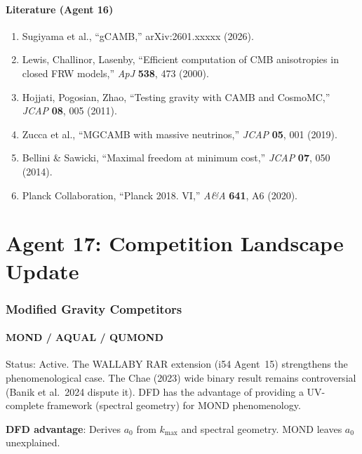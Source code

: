 \documentclass[11pt,a4paper]{article}
\begin{document}
\subsection{Literature (Agent 16)}

\begin{enumerate}
\item Sugiyama et al., ``gCAMB,'' arXiv:2601.xxxxx (2026).
\item Lewis, Challinor, Lasenby, ``Efficient computation of CMB anisotropies in closed FRW models,'' \textit{ApJ} \textbf{538}, 473 (2000).
\item Hojjati, Pogosian, Zhao, ``Testing gravity with CAMB and CosmoMC,'' \textit{JCAP} \textbf{08}, 005 (2011).
\item Zucca et al., ``MGCAMB with massive neutrinos,'' \textit{JCAP} \textbf{05}, 001 (2019).
\item Bellini \& Sawicki, ``Maximal freedom at minimum cost,'' \textit{JCAP} \textbf{07}, 050 (2014).
\item Planck Collaboration, ``Planck 2018. VI,'' \textit{A\&A} \textbf{641}, A6 (2020).
\end{enumerate}


\part{Agent 17: Competition Landscape Update}
\label{part:competition}

\section{Modified Gravity Competitors}

\subsection{MOND / AQUAL / QUMOND}

Status: Active. The WALLABY RAR extension (i54 Agent~15) strengthens the phenomenological case. The Chae (2023) wide binary result remains controversial (Banik et al.\ 2024 dispute it). DFD has the advantage of providing a UV-complete framework (spectral geometry) for MOND phenomenology.

\textbf{DFD advantage}: Derives $a_0$ from $k_{\max}$ and spectral geometry. MOND leaves $a_0$ unexplained.
\end{document}
